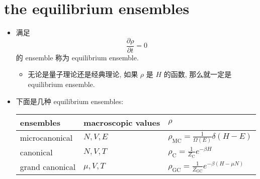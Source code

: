 \section{the equilibrium ensembles}
\begin{itemize}
	\item 满足
	\begin{equation}
		\frac{\partial \rho}{\partial t} = 0
	\end{equation}
	的 ensemble 称为 equilibrium ensemble.
	\begin{itemize}
		\item 无论是量子理论还是经典理论, 如果 $\rho$ 是 $H$ 的函数, 那么就一定是 equilibrium ensemble.
	\end{itemize}
	
	\item 下面是几种 equilibrium ensembles:
	
	\begin{center}
		\begin{tabularx}{\linewidth}{XXX}
			\toprule 
			ensembles & macroscopic values & $\rho$ \\
			\midrule 
			microcanonical & $N, V, E$ & $\rho_\text{MC} = \frac{1}{\Omega(E)} \delta(H - E)$ \\
			canonical & $N, V, T$ & $\rho_\text{C} = \frac{1}{Z_\text{C}} e^{- \beta H}$\\
			grand canonical & $\mu, V, T$ & $\rho_\text{GC} = \frac{1}{Z_\text{GC}} e^{- \beta (H - \mu N)}$ \\
			\bottomrule
		\end{tabularx}
	\end{center}
\end{itemize}
